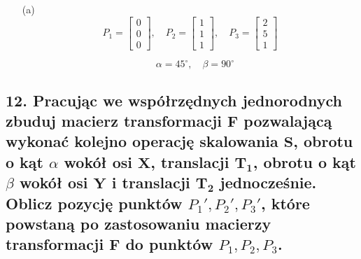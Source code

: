 \begin{enumerate}
    \item[(a)] 
    \[
    P_1 = \begin{bmatrix} 0 \\ 0 \\ 0 \end{bmatrix}, 
    \quad P_2 = \begin{bmatrix} 1 \\ 1 \\ 1 \end{bmatrix}, 
    \quad P_3 = \begin{bmatrix} 2 \\ 5 \\ 1 \end{bmatrix}
    \]
    
    \[
    \quad \alpha = 45^\circ, \quad \beta = 90^\circ
    \]
\end{enumerate}

\subsection*{12. Pracując we współrzędnych jednorodnych zbuduj macierz transformacji \( \mathbf{F} \) 
pozwalającą wykonać kolejno operację skalowania \( \mathbf{S} \), obrotu o kąt \( \alpha \) wokół osi \( \mathbf{X} \), 
translacji \( \mathbf{T_1} \), obrotu o kąt \( \beta \) wokół osi \( \mathbf{Y} \) i translacji \( \mathbf{T_2} \) jednocześnie.
Oblicz pozycję punktów \( P_1', P_2', P_3' \), które powstaną po zastosowaniu macierzy transformacji \( \mathbf{F} \) 
do punktów \( P_1, P_2, P_3 \).}

